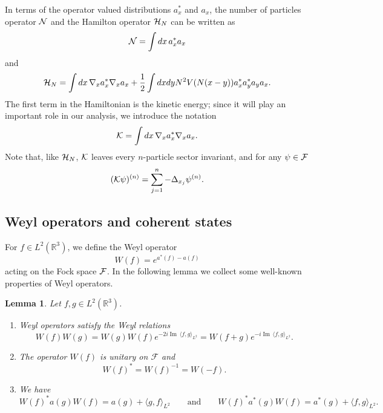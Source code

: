 \documentclass[11pt,a4paper]{article}
\newtheorem{lem}[thm]{Lemma}
\newcommand{\done}{}
\newcommand{\bR}{{\mathbb R}}
\newcommand{\cF}{{\cal F}}
\newcommand{\cK}{{\cal K}}
\newcommand{\cH}{{\cal H}}
\newcommand{\cN}{{\cal N}}
\newcommand{\R}{\mathbb{R}}
\newcommand{\fock}{\mathcal{F}}		%
\newcommand{\di}{{d}}		%
\newcommand{\Ncal}{\mathcal{N}}		%
\newcommand{\scal}[2]{\big<#1,#2\big>} %
\renewcommand{\Im}{\operatorname{Im}\,} 	%
\begin{document}
In terms of the operator valued distributions $a_x^*$ and $a_x$, the number of particles operator $\cN$ 
and the Hamilton operator $\cH_N$ can be written as
\[ \cN = \int dx \, a_x^* a_x \]
and 
\begin{equation}\label{eq:ham-F} \cH_N = \int dx \, \nabla_x a_x^* \nabla_x a_x + \frac{1}{2} \int dx dy N^2 V(N (x-y)) a^*_x a^*_y a_y a_x. \end{equation}
The first term in the Hamiltonian is the kinetic energy; since it will play an important role in our analysis, we introduce the notation 
\[ \cK = \int dx \, \nabla_x a_x^* \nabla_x a_x. \]
Note that, like $\cH_N$, $\cK$ leaves every $n$-particle sector invariant, and for any $\psi \in \cF$
\[ (\cK \psi)^{(n)} = \sum_{j=1}^n -\Delta_{x_j} \psi^{(n)}.\]


\subsection{Weyl operators and coherent states}

For $f \in L^2(\R^3)$, we define the Weyl operator 
\[
  W(f) = e^{a^*(f) - a(f)}\done
\]
acting on the Fock space $\cF$. In the following lemma we collect some well-known properties of Weyl operators.
\begin{lem}\label{l:W}
  Let $f, g \in L^2(\R^3)$.
  \begin{enumerate}
    \item \label{l:W1} Weyl operators satisfy the Weyl relations
      \[
        W(f) W(g) = W(g) W(f) e^{-2i \Im \langle f, g \rangle_{L^2}} = W(f+g)
        e^{-i \Im \langle f, g \rangle_{L^2}}.
      \]
    \item \label{l:W2} The operator $W(f)$ is unitary on $\mathcal{F}$ and
      \[
        W(f)^* = W(f)^{-1} = W(-f).
      \]
    \item \label{l:W3} We have
      \begin{equation}\label{eq:W3}
        W(f)^* a (g)  W(f) = a (g) + \langle g, f \rangle_{L^2}  \qquad \text{and} \qquad W(f)^* a^* (g)
        W(f) = a^* (g) + \langle f, g \rangle_{L^2}.
      \end{equation}
 \end{enumerate}
\end{lem}
\end{document}
